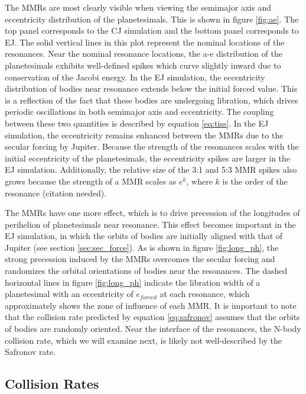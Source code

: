 \documentclass[onecolumn]{aastex63}
\begin{document}
The MMRs are most clearly visible when viewing the semimajor axis and eccentricity distribution of the planetesimals. This is shown 
in figure \ref{fig:ae}. The top panel corresponds to the CJ simulation and the bottom panel corresponds to EJ. The solid vertical lines 
in this plot represent the nominal locations of the resonances. Near the nominal resonance locations, the a-e distribution of the 
planetesimals exhibits well-defined spikes which curve slightly inward due to conservation of the Jacobi energy. In the EJ simulation, 
the eccentricity distribution of bodies near resonance extends below the initial forced value. This is a reflection of the fact that these 
bodies are undergoing libration, which drives periodic oscillations in both semimajor axis and eccentricity. The coupling between 
these two quantities is described by equation \ref{eq:tiss}. In the EJ simulation, the eccentricity remains enhanced between the 
MMRs due to the secular forcing by Jupiter. Because the strength of the resonances scales with the initial eccentricity of the planetesimals, 
the eccentricity spikes are larger in the EJ simulation. Additionally, the relative size of the 3:1 and 5:3 MMR spikes also grows because the 
strength of a MMR scales as $e^{k}$, where $k$ is the order of the resonance (citation needed).

The MMRs have one more effect, which is to drive precession of the longitudes of perihelion of planetesimals near 
resonance. This effect becomes important in the EJ simulation, in which the orbits of bodies are initially aligned with that of Jupiter 
(see section \ref{sec:sec_force}). As is shown in figure \ref{fig:long_ph}, the strong precession induced by the MMRs overcomes the 
secular forcing and randomizes the orbital orientations of bodies near the resonances. The dashed horizontal lines in figure 
\ref{fig:long_ph} indicate the libration width of a planetesimal with an eccentricity of $e_{forced}$ at each resonance, which 
approximately shows the zone of influence of each MMR. It is important to note that the collision rate predicted by equation
\ref{eq:safronov} assumes that the orbits of bodies are randomly oriented. Near the interface of the resonances, the N-body collision rate, 
which we will examine next, is likely not well-described by the Safronov rate.

\subsection{Collision Rates}\label{sec:coll_rates}
\end{document}
